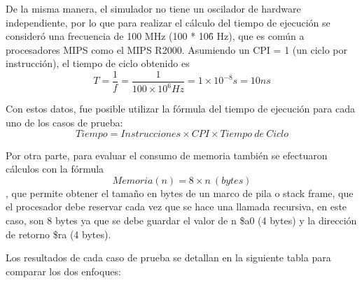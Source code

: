 \documentclass[12pt, letterpaper]{article}
\begin{document}
De la misma manera, el simulador no tiene un oscilador de hardware independiente, por lo que para realizar el cálculo del tiempo de ejecución se consideró una frecuencia de 100 MHz (100 * 10\^6 Hz), que es común a procesadores MIPS como el MIPS R2000. Asumiendo un CPI = 1 (un ciclo por instrucción), el tiempo de ciclo obtenido es 
\[T = \frac{1}{f} = \frac{1}{100 \times 10^{6} Hz} = 1 \times 10^{-8} s = 10 ns\]

Con estos datos, fue posible utilizar la fórmula del tiempo de ejecución para cada uno de los casos de prueba: 
\[Tiempo = Instrucciones \times CPI \times Tiempo\ de\ Ciclo\]

Por otra parte, para evaluar el consumo de memoria también se efectuaron cálculos con la fórmula \[Memoria(n) = 8\times n\ (bytes)\], que permite obtener el tamaño en bytes de un marco de pila o stack frame, que el procesador debe reservar cada vez que se hace una llamada recursiva, en este caso, son 8 bytes ya que se debe guardar el valor de n \$a0 (4 bytes) y la dirección de retorno \$ra (4 bytes).

Los resultados de cada caso de prueba se detallan en la siguiente tabla para comparar los dos enfoques:

\begin{table}[h]
\centering
{}
\end{table}
\end{document}

